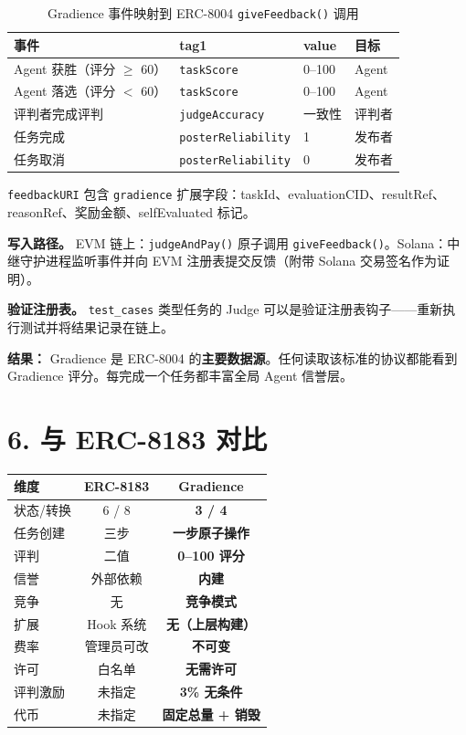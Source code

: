 \documentclass[11pt,a4paper]{article}
\begin{document}
\begin{table}[H]\centering\small
\begin{tabular}{@{}llll@{}}
\toprule
\textbf{事件} & \textbf{tag1} & \textbf{value} & \textbf{目标} \\
\midrule
Agent 获胜（评分 $\geq$ 60） & \texttt{taskScore} & 0--100 & Agent \\
Agent 落选（评分 $<$ 60） & \texttt{taskScore} & 0--100 & Agent \\
评判者完成评判 & \texttt{judgeAccuracy} & 一致性 & 评判者 \\
任务完成 & \texttt{posterReliability} & 1 & 发布者 \\
任务取消 & \texttt{posterReliability} & 0 & 发布者 \\
\bottomrule
\end{tabular}
\caption{Gradience 事件映射到 ERC-8004 \texttt{giveFeedback()} 调用}
\end{table}

\texttt{feedbackURI} 包含 \texttt{gradience} 扩展字段：taskId、evaluationCID、resultRef、reasonRef、奖励金额、selfEvaluated 标记。

\textbf{写入路径。} EVM 链上：\texttt{judgeAndPay()} 原子调用 \texttt{giveFeedback()}。Solana：中继守护进程监听事件并向 EVM 注册表提交反馈（附带 Solana 交易签名作为证明）。

\textbf{验证注册表。} \texttt{test\_cases} 类型任务的 Judge 可以是验证注册表钩子——重新执行测试并将结果记录在链上。

\textbf{结果：} Gradience 是 ERC-8004 的\textbf{主要数据源}。任何读取该标准的协议都能看到 Gradience 评分。每完成一个任务都丰富全局 Agent 信誉层。

\section{6. 与 ERC-8183 对比}

\begin{table}[H]\centering\small
\begin{tabular}{@{}lcc@{}}
\toprule
\textbf{维度} & \textbf{ERC-8183} & \textbf{Gradience} \\
\midrule
状态/转换 & 6 / 8 & \textbf{3 / 4} \\
任务创建 & 三步 & \textbf{一步原子操作} \\
评判 & 二值 & \textbf{0--100 评分} \\
信誉 & 外部依赖 & \textbf{内建} \\
竞争 & 无 & \textbf{竞争模式} \\
扩展 & Hook 系统 & \textbf{无（上层构建）} \\
费率 & 管理员可改 & \textbf{不可变} \\
许可 & 白名单 & \textbf{无需许可} \\
评判激励 & 未指定 & \textbf{3\% 无条件} \\
代币 & 未指定 & \textbf{固定总量 + 销毁} \\
\bottomrule
\end{tabular}
\end{table}
\end{document}
